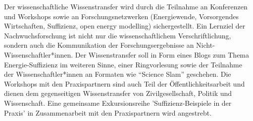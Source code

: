 \documentclass[a4paper,11pt,twoside]{scrartcl}
\begin{document}
Der wissenschaftliche Wissenstransfer wird durch die Teilnahme an Konferenzen und Workshops sowie an Forschungsnetzwerken (Energiewende, Vorsorgendes Wirtschaften, Suffizienz, open energy modelling) sichergestellt. Ein Lernziel der Nachwuchsforschung ist nicht nur die wissenschaftlichem Verschriftlichung, sondern auch die Kommunikation der Forschungsergebnisse an Nicht-Wissenschaftler*innen. Der Wissenstransfer soll in Form eines Blogs zum Thema Energie-Suffizienz im weiteren Sinne, einer Ringvorlesung sowie der Teilnahme der Wissenschaftler*innen an Formaten wie ``Science Slam'' geschehen. Die Workshops mit den Praxispartnern sind auch Teil der Öffentlichkeitsarbeit und dienen dem gegenseitigen Wissenstransfer von Zivilgesellschaft, Politik und Wissenschaft. Eine gemeinsame Exkursionsreihe 'Suffizienz-Beispiele in der Praxis' in Zusammenarbeit mit den Praxispartnern wird angestrebt.
\end{document}

